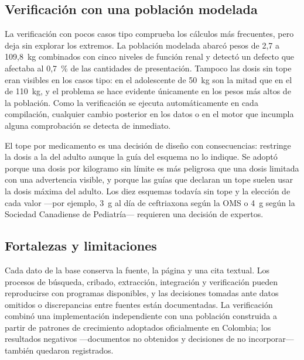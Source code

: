 \documentclass[11pt,a4paper]{article}
\begin{document}
\subsection{Verificación con una población modelada}

La verificación con pocos casos tipo comprueba los cálculos más frecuentes, pero deja sin explorar los extremos. La población modelada abarcó pesos de 2,7 a 109,8~kg combinados con cinco niveles de función renal y detectó un defecto que afectaba al 0,7~\% de las cantidades de presentación. Tampoco las dosis sin tope eran visibles en los casos tipo: en el adolescente de 50~kg son la mitad que en el de 110~kg, y el problema se hace evidente únicamente en los pesos más altos de la población. Como la verificación se ejecuta automáticamente en cada compilación, cualquier cambio posterior en los datos o en el motor que incumpla alguna comprobación se detecta de inmediato.

El tope por medicamento es una decisión de diseño con consecuencias: restringe la dosis a la del adulto aunque la guía del esquema no lo indique. Se adoptó porque una dosis por kilogramo sin límite es más peligrosa que una dosis limitada con una advertencia visible, y porque las guías que declaran un tope suelen usar la dosis máxima del adulto. Los diez esquemas todavía sin tope y la elección de cada valor ---por ejemplo, 3~g al día de ceftriaxona según la OMS o 4~g según la Sociedad Canadiense de Pediatría--- requieren una decisión de expertos.

\subsection{Fortalezas y limitaciones}

Cada dato de la base conserva la fuente, la página y una cita textual. Los procesos de búsqueda, cribado, extracción, integración y verificación pueden reproducirse con programas disponibles, y las decisiones tomadas ante datos omitidos o discrepancias entre fuentes están documentadas. La verificación combinó una implementación independiente con una población construida a partir de patrones de crecimiento adoptados oficialmente en Colombia; los resultados negativos ---documentos no obtenidos y decisiones de no incorporar--- también quedaron registrados.
\end{document}
